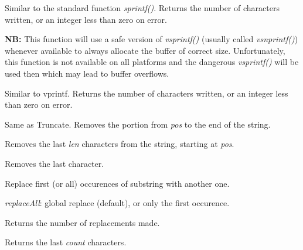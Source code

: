 Similar to the standard function {\it sprintf()}. Returns the number of
characters written, or an integer less than zero on error.

{\bf NB:} This function will use a safe version of {\it vsprintf()} (usually called 
{\it vsnprintf()}) whenever available to always allocate the buffer of correct
size. Unfortunately, this function is not available on all platforms and the
dangerous {\it vsprintf()} will be used then which may lead to buffer overflows.

\label{wxstringprintfv}


Similar to vprintf. Returns the number of characters written, or an integer less than zero
on error.

\label{wxstringremove}


Same as Truncate. Removes the portion from {\it pos} to the end of the string.


Removes the last {\it len} characters from the string, starting at {\it pos}.

\label{wxstringremovelast}


Removes the last character.

\label{wxstringreplace}


Replace first (or all) occurences of substring with another one.

{\it replaceAll}: global replace (default), or only the first occurence.

Returns the number of replacements made.

\label{wxstringright}


Returns the last {\it count} characters.


